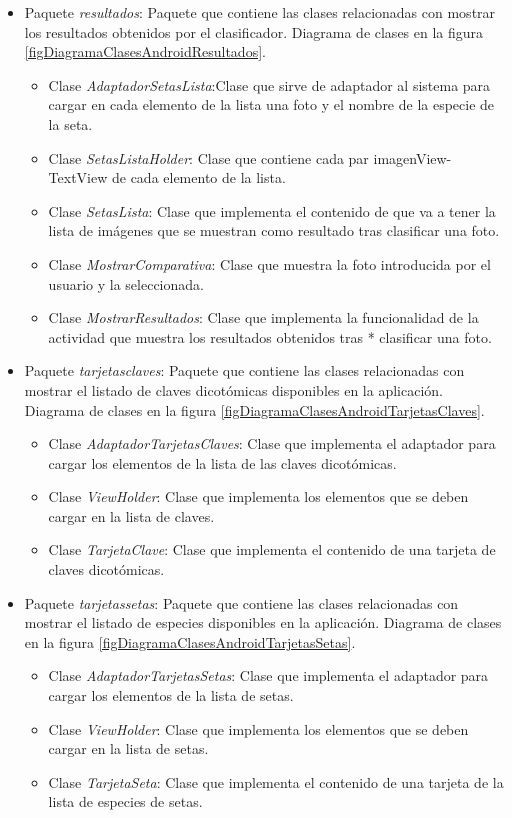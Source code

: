 \begin{itemize}
	\item Paquete \textit{resultados}: Paquete que contiene las clases relacionadas con mostrar los resultados obtenidos por el clasificador. Diagrama de clases en la figura \ref{figDiagramaClasesAndroidResultados}.
	\begin{itemize}
		\item Clase \textit{AdaptadorSetasLista}:Clase que sirve de adaptador al sistema para cargar en cada elemento de la lista una foto y el nombre de la especie de la seta.
		\item Clase \textit{SetasListaHolder}: Clase que contiene cada par imagenView-TextView de cada elemento de la lista.
		\item Clase \textit{SetasLista}: Clase que implementa el contenido de que va a tener la lista de imágenes que se muestran como resultado tras clasificar una foto.
		\item Clase \textit{MostrarComparativa}: Clase que muestra la foto introducida por el usuario y la seleccionada.
		\item Clase \textit{MostrarResultados}: Clase que implementa la funcionalidad de la actividad que muestra los resultados obtenidos tras
 * clasificar una foto.
	\end{itemize}
	
	
	\item Paquete \textit{tarjetasclaves}: Paquete que contiene las clases relacionadas con mostrar el listado de claves dicotómicas disponibles en la aplicación. Diagrama de clases en la figura \ref{figDiagramaClasesAndroidTarjetasClaves}.
	\begin{itemize}
		\item Clase \textit{AdaptadorTarjetasClaves}: Clase que implementa el adaptador para cargar los elementos de la lista de las claves dicotómicas.
		\item Clase \textit{ViewHolder}: Clase que implementa los elementos que se deben cargar en la lista de claves.
		\item Clase \textit{TarjetaClave}: Clase que implementa el contenido de una tarjeta de claves dicotómicas.
	\end{itemize}
	
	
	\item Paquete \textit{tarjetassetas}: Paquete que contiene las clases relacionadas con mostrar el listado de especies disponibles en la aplicación. Diagrama de clases en la figura \ref{figDiagramaClasesAndroidTarjetasSetas}.
	\begin{itemize}
		\item Clase \textit{AdaptadorTarjetasSetas}: Clase que implementa el adaptador para cargar los elementos de la lista de setas.
		\item Clase \textit{ViewHolder}: Clase que implementa los elementos que se deben cargar en la lista de setas.
		\item Clase \textit{TarjetaSeta}: Clase que implementa el contenido de una tarjeta de la lista de especies de setas.
	\end{itemize}
	

\end{itemize}
